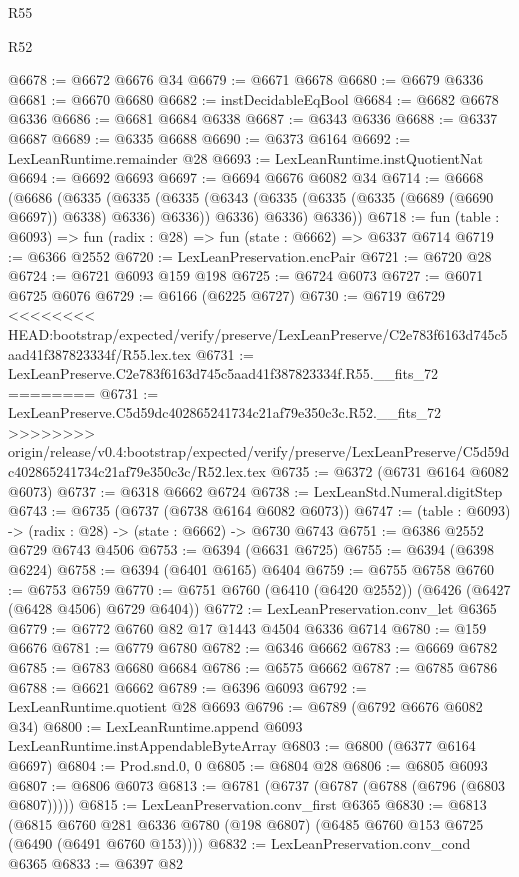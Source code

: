 \begin{lexlean}{R55}
\begin{lexlean}{R52}
\begin{coremodule}
{{{{{{{{{{{{{{{{{{{{{{{{{{{{{{{{{{{{{{{{{{{{{{{{{{{{{{{{{{{{{{{{{{{{{{{{{{{{{{{{{{{{{{{{{{{{{{{{{{{{{{{{{{{{{{{{{{{{{{{{{{{{{{{{{{{{{{{{{{{{{{{{{{{{{{{{{{{{{{{{{{{{{{{{{{{{{{{{{{{{{{{{{{{{{{{{{{{{{{@6678 := @6672 @6676 @34
@6679 := @6671 @6678
@6680 := @6679 @6336
@6681 := @6670 @6680
@6682 := instDecidableEqBool
@6684 := @6682 @6678 @6336
@6686 := @6681 @6684 @6338
@6687 := @6343 @6336
@6688 := @6337 @6687
@6689 := @6335 @6688
@6690 := @6373 @6164
@6692 := LexLeanRuntime.remainder @28
@6693 := LexLeanRuntime.instQuotientNat
@6694 := @6692 @6693
@6697 := @6694 @6676 @6082 @34
@6714 := @6668
    (@6686
      (@6335
        (@6335
          (@6335 (@6343 (@6335 (@6335 (@6335 (@6689 (@6690 @6697)) @6338) @6336) @6336)) @6336)
          @6336)
        @6336))
@6718 := fun (table : @6093) => fun (radix : @28) => fun (state : @6662) => @6337 @6714
@6719 := @6366 @2552
@6720 := LexLeanPreservation.encPair
@6721 := @6720 @28
@6724 := @6721 @6093 @159 @198
@6725 := @6724 @6073
@6727 := @6071 @6725 @6076
@6729 := @6166 (@6225 @6727)
@6730 := @6719 @6729
<<<<<<<< HEAD:bootstrap/expected/verify/preserve/LexLeanPreserve/C2e783f6163d745c5aad41f387823334f/R55.lex.tex
@6731 := LexLeanPreserve.C2e783f6163d745c5aad41f387823334f.R55.__fits_72
========
@6731 := LexLeanPreserve.C5d59dc402865241734c21af79e350c3c.R52.__fits_72
>>>>>>>> origin/release/v0.4:bootstrap/expected/verify/preserve/LexLeanPreserve/C5d59dc402865241734c21af79e350c3c/R52.lex.tex
@6735 := @6372 (@6731 @6164 @6082 @6073)
@6737 := @6318 @6662 @6724
@6738 := LexLeanStd.Numeral.digitStep
@6743 := @6735 (@6737 (@6738 @6164 @6082 @6073))
@6747 := (table : @6093) -> (radix : @28) -> (state : @6662) -> @6730 @6743
@6751 := @6386 @2552 @6729 @6743 @4506
@6753 := @6394 (@6631 @6725)
@6755 := @6394 (@6398 @6224)
@6758 := @6394 (@6401 @6165) @6404
@6759 := @6755 @6758
@6760 := @6753 @6759
@6770 := @6751 @6760 (@6410 (@6420 @2552)) (@6426 (@6427 (@6428 @4506) @6729 @6404))
@6772 := LexLeanPreservation.conv_let @6365
@6779 := @6772 @6760 @82 @17 @1443 @4504 @6336 @6714
@6780 := @159 @6676
@6781 := @6779 @6780
@6782 := @6346 @6662
@6783 := @6669 @6782
@6785 := @6783 @6680 @6684
@6786 := @6575 @6662
@6787 := @6785 @6786
@6788 := @6621 @6662
@6789 := @6396 @6093
@6792 := LexLeanRuntime.quotient @28 @6693
@6796 := @6789 (@6792 @6676 @6082 @34)
@6800 := LexLeanRuntime.append @6093 LexLeanRuntime.instAppendableByteArray
@6803 := @6800 (@6377 @6164 @6697)
@6804 := Prod.snd.{0, 0}
@6805 := @6804 @28
@6806 := @6805 @6093
@6807 := @6806 @6073
@6813 := @6781 (@6737 (@6787 (@6788 (@6796 (@6803 @6807)))))
@6815 := LexLeanPreservation.conv_first @6365
@6830 := @6813
    (@6815 @6760 @281 @6336 @6780 (@198 @6807) (@6485 @6760 @153 @6725 (@6490 (@6491 @6760 @153))))
@6832 := LexLeanPreservation.conv_cond @6365
@6833 := @6397 @82
}}}}}}}}}}}}}}}}}}}}}}}}}}}}}}}}}}}}}}}}}}}}}}}}}}}}}}}}}}}}}}}}}}}}}}}}}}}}}}}}}}}}}}}}}}}}}}}}}}}}}}}}}}}}}}}}}}}}}}}}}}}}}}}}}}}}}}}}}}}}}}}}}}}}}}}}}}}}}}}}}}}}}}}}}}}}}}}}}}}}}}}}}}}}}}}}}}}}}}
\end{coremodule}
\end{lexlean}
\end{lexlean}
